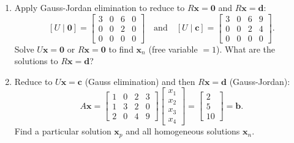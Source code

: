 \documentclass[14pt, a4paper]{article}
\begin{document}
\begin{enumerate}[resume]
    \item Apply Gauss-Jordan elimination to reduce to $R\mathbf{x} = \mathbf{0}$ and $R\mathbf{x} = \mathbf{d}$:
          \[
              [U \mid \mathbf{0}] = \begin{bmatrix}
                  3 & 0 & 6 & 0 \\
                  0 & 0 & 2 & 0 \\
                  0 & 0 & 0 & 0
              \end{bmatrix}
              \quad \text{and} \quad
              [U \mid \mathbf{c}] = \begin{bmatrix}
                  3 & 0 & 6 & 9 \\
                  0 & 0 & 2 & 4 \\
                  0 & 0 & 0 & 0
              \end{bmatrix}.
          \]
          Solve $U\mathbf{x} = \mathbf{0}$ or $R\mathbf{x} = \mathbf{0}$ to find $\mathbf{x}_n$ (free variable $= 1$). What are the solutions to $R\mathbf{x} = \mathbf{d}$?

    \item Reduce to $U\mathbf{x} = \mathbf{c}$ (Gauss elimination) and then $R\mathbf{x} = \mathbf{d}$ (Gauss-Jordan):
          \[
              A\mathbf{x} =
              \begin{bmatrix}
                  1 & 0 & 2 & 3 \\
                  1 & 3 & 2 & 0 \\
                  2 & 0 & 4 & 9
              \end{bmatrix}
              \begin{bmatrix} x_1 \\ x_2 \\ x_3 \\ x_4 \end{bmatrix}
              =
              \begin{bmatrix} 2 \\ 5 \\ 10 \end{bmatrix}
              = \mathbf{b}.
          \]
          Find a particular solution $\mathbf{x}_p$ and all homogeneous solutions $\mathbf{x}_n$.


\end{enumerate}
\end{document}
